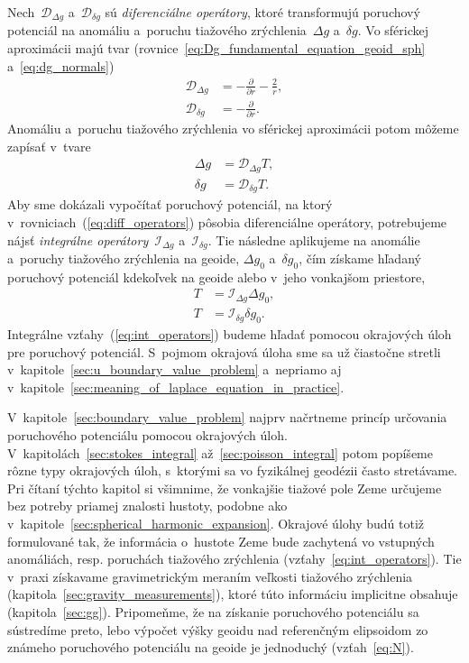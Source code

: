 \documentclass[a4paper, 12pt]{book}
\newcommand{\DIFF}{\mathcal D}
\newcommand{\INT}{\mathcal I}
\begin{document}
Nech~$\DIFF_{\Delta g}$ a~$\DIFF_{\delta g}$ sú \emph{diferenciálne operátory}, 
ktoré transformujú poruchový potenciál na anomáliu a~poruchu tiažového 
zrýchlenia~$\Delta g$ a~$\delta g$.  Vo sférickej aproximácii majú tvar 
(rovnice~\ref{eq:Dg_fundamental_equation_geoid_sph} a~\ref{eq:dg_normals})
%
\begin{equation}
\label{eq:diff_Dg}
\begin{split}
\DIFF_{\Delta g} &= -\frac{\partial}{\partial r} - \frac{2}{r}{,}\\
%
\DIFF_{\delta g} &= -\frac{\partial}{\partial r}{.}
\end{split}
\end{equation}
%
Anomáliu a~poruchu tiažového zrýchlenia vo sférickej aproximácii potom môžeme 
zapísať v~tvare
%
\begin{equation}
\label{eq:diff_operators}
\begin{split}
\Delta g &= \DIFF_{\Delta g}T{,}\\
%
\delta g &= \DIFF_{\delta g}T{.}
\end{split}
\end{equation}
%
Aby sme dokázali vypočítať poruchový potenciál, na ktorý 
v~rovniciach~(\ref{eq:diff_operators}) pôsobia diferenciálne operátory, 
potrebujeme nájsť \emph{integrálne operátory}~$\INT_{\Delta g}$ a~$\INT_{\delta 
g}$.  Tie následne aplikujeme na anomálie a~poruchy tiažového zrýchlenia na 
geoide, $\Delta g_0$ a~$\delta g_0$, čím získame hľadaný poruchový potenciál 
kdekoľvek na geoide alebo v~jeho vonkajšom priestore,
%
\begin{equation}
\label{eq:int_operators}
\begin{split}
T &= \INT_{\Delta g} \Delta g_0{,}\\
%
T &= \INT_{\delta g}\delta g_0{.}
\end{split}
\end{equation}
%
Integrálne vzťahy~(\ref{eq:int_operators}) budeme hľadať pomocou okrajových 
úloh pre poruchový potenciál.  S~pojmom okrajová úloha sme sa už čiastočne 
stretli v~kapitole~\ref{sec:u_boundary_value_problem} a~nepriamo aj 
v~kapitole~\ref{sec:meaning_of_laplace_equation_in_practice}.

V~kapitole~\ref{sec:boundary_value_problem} najprv načrtneme princíp určovania 
poruchového potenciálu pomocou okrajových úloh.  
V~kapitolách~\ref{sec:stokes_integral} až~\ref{sec:poisson_integral} potom 
popíšeme rôzne typy okrajových úloh, s~ktorými sa vo fyzikálnej geodézii často 
stretávame.  Pri čítaní týchto kapitol si všimnime, že vonkajšie tiažové pole 
Zeme určujeme bez potreby priamej znalosti hustoty, podobne ako 
v~kapitole~\ref{sec:spherical_harmonic_expansion}.  Okrajové úlohy budú totiž 
formulované tak, že informácia o~hustote Zeme bude zachytená vo vstupných 
anomáliách, resp. poruchách tiažového zrýchlenia 
(vzťahy~\ref{eq:int_operators}).  Tie v~praxi získavame gravimetrickým meraním 
veľkosti tiažového zrýchlenia (kapitola~\ref{sec:gravity_measurements}), ktoré 
túto informáciu implicitne obsahuje (kapitola~\ref{sec:gg}).  Pripomeňme, že na 
získanie poruchového potenciálu sa sústredíme preto, lebo výpočet výšky geoidu 
nad referenčným elipsoidom zo známeho poruchového potenciálu na geoide je 
jednoduchý (vzťah~\ref{eq:N}).
\end{document}
